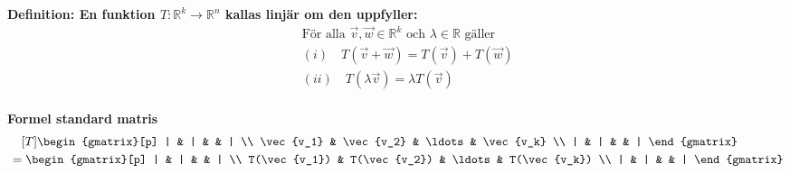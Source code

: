 \begin{multicols}{2}
\textbf{Definition: En funktion $T:\mathbb{R}^k\to\mathbb{R}^n$ kallas linjär om den uppfyller:}
\begin{align*}
  &\quad  \text{För alla } \vec{v},\vec{w}\in\mathbb{R}^k
  \text{ och } \lambda\in\mathbb{R} \text{ gäller} \\
  &\quad  (i) \quad T(\vec{v}+\vec{w})=T(\vec{v})+T(\vec{w}) \\
  &\quad  (ii) \quad T(\lambda\vec{v})=\lambda T(\vec{v}) \\
\end{align*}

\textbf{Formel standard matris}
\begin{align*}
  &\quad  [T]
  \begin{gmatrix}[p]
    | & | & & | \\
    \vec{v_1} & \vec{v_2} & \ldots & \vec{v_k} \\
    | & | & & |
  \end{gmatrix} \\
  &=\begin{gmatrix}[p]
    | & | & & | \\
    T(\vec{v_1}) & T(\vec{v_2}) & \ldots & T(\vec{v_k}) \\
    | & | & & |
  \end{gmatrix}  \\
\end{align*}



\end{multicols}
